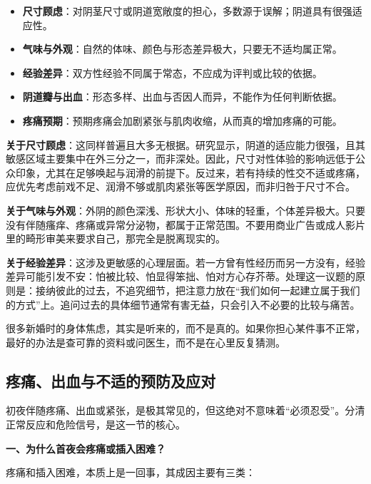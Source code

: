 \documentclass[12pt,UTF8]{ctexbook}
\begin{document}
\begin{itemize}
\item \textbf{尺寸顾虑}：对阴茎尺寸或阴道宽敞度的担心，多数源于误解；阴道具有很强适应性。
\item \textbf{气味与外观}：自然的体味、颜色与形态差异极大，只要无不适均属正常。
\item \textbf{经验差异}：双方性经验不同属于常态，不应成为评判或比较的依据。
\item \textbf{阴道瓣与出血}：形态多样、出血与否因人而异，不能作为任何判断依据。
\item \textbf{疼痛预期}：预期疼痛会加剧紧张与肌肉收缩，从而真的增加疼痛的可能。
\end{itemize}

\textbf{关于尺寸顾虑}：这同样普遍且大多无根据。研究显示，阴道的适应能力很强，且其敏感区域主要集中在外三分之一，而非深处。因此，尺寸对性体验的影响远低于公众印象，尤其在足够唤起与润滑的前提下。反过来，若有持续的性交不适或疼痛，应优先考虑前戏不足、润滑不够或肌肉紧张等医学原因，而非归咎于尺寸不合。

\textbf{关于气味与外观}：外阴的颜色深浅、形状大小、体味的轻重，个体差异极大。只要没有伴随瘙痒、疼痛或异常分泌物，都属于正常范围。不要用商业广告或成人影片里的畸形审美来要求自己，那完全是脱离现实的。

\textbf{关于经验差异}：这涉及更敏感的心理层面。若一方曾有性经历而另一方没有，经验差异可能引发不安：怕被比较、怕显得笨拙、怕对方心存芥蒂。处理这一议题的原则是：接纳彼此的过去，不追究细节，把注意力放在“我们如何一起建立属于我们的方式”上。追问过去的具体细节通常有害无益，只会引入不必要的比较与痛苦。

\begin{tcolorbox}[colback=pink!5!white,colframe=red!50!black,title=贴心小叮咛]
很多新婚时的身体焦虑，其实是听来的，而不是真的。如果你担心某件事不正常，最好的办法是查可靠的资料或问医生，而不是在心里反复猜测。
\end{tcolorbox}

\subsection{疼痛、出血与不适的预防及应对}

初夜伴随疼痛、出血或紧张，是极其常见的，但这绝对不意味着“必须忍受”。分清正常反应和危险信号，是这一节的核心。

\textbf{一、为什么首夜会疼痛或插入困难？}

疼痛和插入困难，本质上是一回事，其成因主要有三类：
\end{document}
